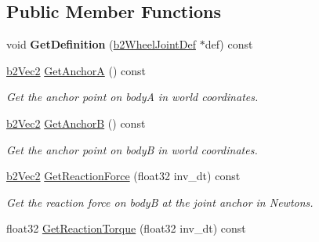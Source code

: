 \subsection*{Public Member Functions}
\begin{DoxyCompactItemize}
\item 
\hypertarget{classb2_wheel_joint_a93f730702a2246be33c15f74861f0df5}{void {\bfseries Get\-Definition} (\hyperlink{structb2_wheel_joint_def}{b2\-Wheel\-Joint\-Def} $\ast$def) const }\label{classb2_wheel_joint_a93f730702a2246be33c15f74861f0df5}

\item 
\hypertarget{classb2_wheel_joint_a6499dcd788d29f06c2e1b28c755e01c8}{\hyperlink{structb2_vec2}{b2\-Vec2} \hyperlink{classb2_wheel_joint_a6499dcd788d29f06c2e1b28c755e01c8}{Get\-Anchor\-A} () const }\label{classb2_wheel_joint_a6499dcd788d29f06c2e1b28c755e01c8}

\begin{DoxyCompactList}\small\item\em Get the anchor point on body\-A in world coordinates. \end{DoxyCompactList}\item 
\hypertarget{classb2_wheel_joint_ace182061f7f78ac2ec3f957a763ca5d3}{\hyperlink{structb2_vec2}{b2\-Vec2} \hyperlink{classb2_wheel_joint_ace182061f7f78ac2ec3f957a763ca5d3}{Get\-Anchor\-B} () const }\label{classb2_wheel_joint_ace182061f7f78ac2ec3f957a763ca5d3}

\begin{DoxyCompactList}\small\item\em Get the anchor point on body\-B in world coordinates. \end{DoxyCompactList}\item 
\hypertarget{classb2_wheel_joint_aa16e3a1c0246017bc25e72cf494daa42}{\hyperlink{structb2_vec2}{b2\-Vec2} \hyperlink{classb2_wheel_joint_aa16e3a1c0246017bc25e72cf494daa42}{Get\-Reaction\-Force} (float32 inv\-\_\-dt) const }\label{classb2_wheel_joint_aa16e3a1c0246017bc25e72cf494daa42}

\begin{DoxyCompactList}\small\item\em Get the reaction force on body\-B at the joint anchor in Newtons. \end{DoxyCompactList}\item 
\hypertarget{classb2_wheel_joint_ae88eeec295a19f216acab9b23d9c704b}{float32 \hyperlink{classb2_wheel_joint_ae88eeec295a19f216acab9b23d9c704b}{Get\-Reaction\-Torque} (float32 inv\-\_\-dt) const }\label{classb2_wheel_joint_ae88eeec295a19f216acab9b23d9c704b}


\end{DoxyCompactItemize}
